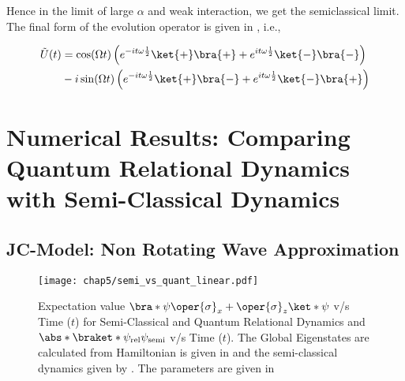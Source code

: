 Hence in the limit of large \(\alpha\) and weak interaction, we get the 
semiclassical limit. The final form of the evolution operator is given in , i.e., 

\begin{mdframed}
    \begin{align}
    \label{eq:appen_JCM_V_g_limit2}
    \tilde{U}(t) 
    &= \cos(\Omega t) \left(e^{-i t \omega \frac{1}{2}}\ket{+}\bra{+} + 
    e^{i t \omega \frac{1}{2}}\ket{-}\bra{-} \right)  \nonumber \\
    &- i \sin(\Omega t)
     \left( e^{-i t \omega \frac{1}{2}}\ket{+}\bra{-}
    + e^{i t \omega \frac{1}{2}}\ket{-}\bra{+}\right) 
\end{align}
\end{mdframed}

\section{Numerical Results: Comparing Quantum Relational Dynamics with Semi-Classical Dynamics
\label{sec:chap5_numerical_results}}

\subsection*{JC-Model: Non Rotating Wave Approximation} 
\begin{figure}[!h]
    \centering
    \texttt{[image: chap5/semi\_vs\_quant\_linear.pdf]}
    \caption{Expectation value
        \(\bra*{\psi} \oper{\sigma}_x + \oper{\sigma}_z \ket*{\psi}\) v/s Time ($t$) for Semi-Classical and Quantum Relational Dynamics
    and \(\abs*{\braket*{\psi_{\mathrm{rel}}}{\psi_{\mathrm{semi}}}}\) v/s Time ($t$). The Global Eigenstates are calculated from 
    Hamiltonian is given in  and the semi-classical dynamics given by . The parameters 
    are given in 
    }
     \label{fig:chap5_linear_semi_vs_quant}
\end{figure}


